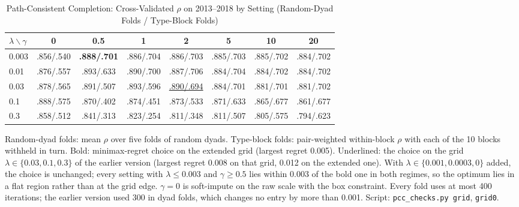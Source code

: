 \documentclass[journal]{IEEEtran}
\begin{document}
\setcounter{table}{18}\begin{table}[!t]
\caption{Path-Consistent Completion: Cross-Validated $\rho$ on 2013--2018 by Setting (Random-Dyad Folds / Type-Block Folds)}
\centering\scriptsize
\setlength{\tabcolsep}{1.6pt}
\begin{tabular}{@{}l c c c c c c c@{}}
\toprule
$\lambda\backslash\gamma$ & 0 & 0.5 & 1 & 2 & 5 & 10 & 20\\
\midrule
0.003 & .856/.540 & \textbf{.888/.701} & .886/.704 & .886/.703 & .885/.703 & .885/.702 & .884/.702\\
0.01 & .876/.557 & .893/.633 & .890/.700 & .887/.706 & .884/.704 & .884/.702 & .884/.702\\
0.03 & .878/.565 & .891/.507 & .893/.596 & \underline{.890/.694} & .884/.701 & .881/.701 & .881/.702\\
0.1 & .888/.575 & .870/.402 & .874/.451 & .873/.533 & .871/.633 & .865/.677 & .861/.677\\
0.3 & .858/.512 & .841/.313 & .823/.254 & .811/.348 & .811/.507 & .805/.575 & .794/.623\\
\bottomrule
\end{tabular}
\vspace{2pt}
\parbox{\columnwidth}{\scriptsize Random-dyad folds: mean $\rho$ over five folds of random dyads. Type-block folds: pair-weighted within-block $\rho$ with each of the 10 blocks withheld in turn. Bold: minimax-regret choice on the extended grid (largest regret 0.005). Underlined: the choice on the grid $\lambda\in\{0.03,0.1,0.3\}$ of the earlier version (largest regret 0.008 on that grid, 0.012 on the extended one). With $\lambda\in\{0.001,0.0003,0\}$ added, the choice is unchanged; every setting with $\lambda\le0.003$ and $\gamma\ge0.5$ lies within 0.003 of the bold one in both regimes, so the optimum lies in a flat region rather than at the grid edge. $\gamma=0$ is soft-impute on the raw scale with the box constraint. Every fold uses at most 400 iterations; the earlier version used 300 in dyad folds, which changes no entry by more than 0.001. Script: \texttt{pcc\_checks.py grid}, \texttt{grid0}.}
\end{table}
\end{document}
